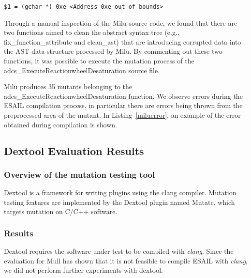 \noindent\begin{minipage}{0.8\textwidth}
\begin{lstlisting}[language={}]
$1 = (gchar *) 0xe <Address 0xe out of bounds>
\end{lstlisting}
\end{minipage}

Through a manual inspection of the Milu source code, we found that there are two functions aimed to clean the abstract syntax tree (e.g., fix\_function\_attribute and clean\_ast) that are introducing corrupted data into the AST data structure processed by Milu.
By commenting out these two functions, it was possible to execute the mutation process of the adcs\_ExecuteReactionwheelDesaturation source file. 

Milu produces 35 mutants belonging to the adcs\_ExecuteReactionwheelDesaturation function.
 We observe errors during the ESAIL compilation process, in particular there are errors being thrown from the preprocessed area of the mutant. In Listing~\ref{miluerror}, an example of the error obtained during compilation is shown.



\subsection{Dextool Evaluation Results}
\label{subsec:dextool}

\subsubsection{Overview of the mutation testing tool}

Dextool is a framework for writing plugins using the clang compiler. Mutation testing features are implemented by the Dextool plugin named Mutate, which targets mutation on C/C++ software.

\subsubsection{Results}

Dextool requires the software under test to be compiled with \emph{clang}.
Since the evaluation for Mull has shown that it is not feasible to compile ESAIL with \emph{clang}, we did not perform further experiments with dextool.



